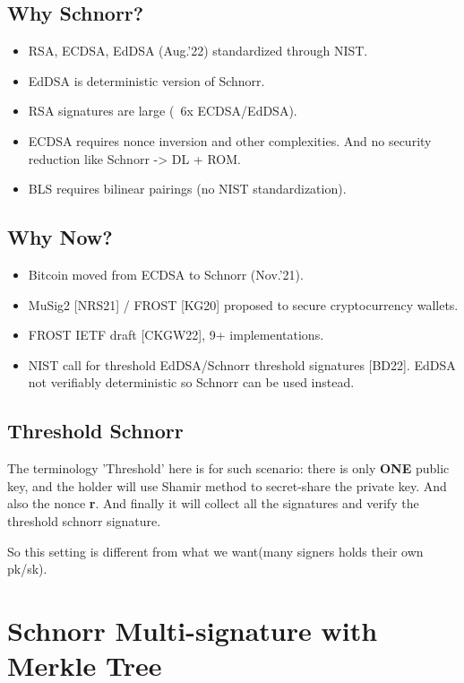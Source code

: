 \documentclass{article}
\begin{document}
\subsection{Why Schnorr?}

\begin{itemize}
    \item RSA, ECDSA, EdDSA (Aug.’22) standardized through NIST.
    \item EdDSA is deterministic version of Schnorr.
    \item RSA signatures are large (~6x ECDSA/EdDSA).
    \item ECDSA requires nonce inversion and other complexities. And no security reduction like Schnorr -> DL + ROM.
    \item BLS requires bilinear pairings (no NIST standardization).
    
\end{itemize}

\subsection{Why Now?}

\begin{itemize}
    \item Bitcoin moved from ECDSA to Schnorr (Nov.’21).
    \item MuSig2 [NRS21] / FROST [KG20] proposed to secure cryptocurrency wallets.
    \item FROST IETF draft [CKGW22], 9+ implementations.
    \item NIST call for threshold EdDSA/Schnorr threshold signatures [BD22]. EdDSA not verifiably deterministic so Schnorr can be used instead.
\end{itemize}


\subsection{Threshold Schnorr}

The terminology 'Threshold' here is for such scenario: there is only \textbf{ONE} public key, and the holder will use Shamir method to secret-share the private key.
And also the nonce \textbf{r}.
And finally it will collect all the signatures and verify the threshold schnorr signature.


So this setting is different from what we want(many signers holds their own pk/sk).


\section{Schnorr Multi-signature with Merkle Tree}
\end{document}
